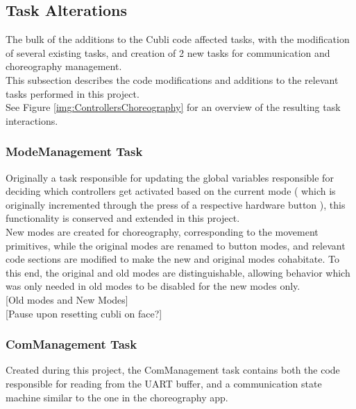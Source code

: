 \subsection{Task Alterations}

The bulk of the additions to the Cubli code affected tasks, with the modification of several existing tasks, and creation of 2 new tasks for communication and choreography management.\\

This subsection describes the code modifications and additions to the relevant tasks performed in this project.\\

See Figure \ref{img:ControllersChoreography} for an overview of the resulting task interactions.

\subsubsection{ModeManagement Task}

Originally a task responsible for updating the global variables responsible for deciding which controllers get activated based on the current mode ( which is originally incremented through the press of a respective hardware button ), this functionality is conserved and extended in this project.\\

New modes are created for choreography, corresponding to the movement primitives, while the original modes are renamed to button modes, and relevant code sections are modified to make the new and original modes cohabitate. To this end, the original and old modes are distinguishable, allowing behavior which was only needed in old modes to be disabled for the new modes only.\\

[Old modes and New Modes]\\

[Pause upon resetting cubli on face?]\\

\subsubsection{ComManagement Task}

Created during this project, the ComManagement task contains both the code responsible for reading from the UART buffer, and a communication state machine similar to the one in the choreography app.\\

